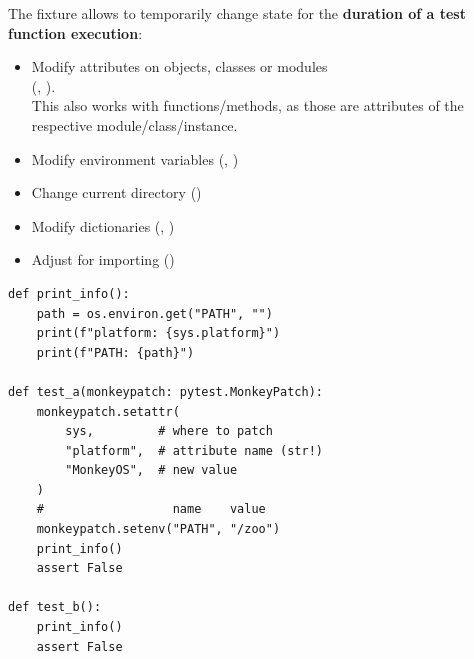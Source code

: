 

The  fixture allows to temporarily change state for the
\textbf{duration of a test function execution}:

\begin{itemize}[itemsep=0pt]
    \item Modify attributes on objects, classes or modules \\ (, ). \\
          This also works with functions/methods, as those are attributes of the respective module/class/instance.
    \item Modify environment variables (, )
    \item Change current directory ()
    \item Modify dictionaries (, )
    \item Adjust  for importing ()
\end{itemize}

\begin{verbatim}
def print_info():
    path = os.environ.get("PATH", "")
    print(f"platform: {sys.platform}")
    print(f"PATH: {path}")

def test_a(monkeypatch: pytest.MonkeyPatch):
    monkeypatch.setattr(
        sys,         # where to patch
        "platform",  # attribute name (str!)
        "MonkeyOS",  # new value
    )
    #                  name    value
    monkeypatch.setenv("PATH", "/zoo")
    print_info()
    assert False

def test_b():
    print_info()
    assert False
\end{verbatim}

\vspace{1em}
\begin{center}
\end{center}
